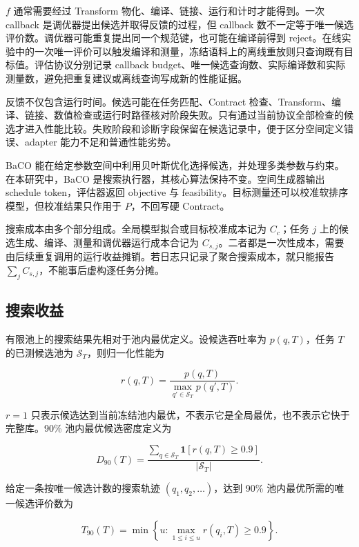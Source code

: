 $f$ 通常需要经过 Transform 物化、编译、链接、运行和计时才能得到。一次 callback 是调优器提出候选并取得反馈的过程，但 callback 数不一定等于唯一候选评价数。调优器可能重复提出同一个规范键，也可能在编译前得到 reject。在线实验中的一次唯一评价可以触发编译和测量，冻结语料上的离线重放则只查询既有目标值。评估协议分别记录 callback budget、唯一候选查询数、实际编译数和实际测量数，避免把重复建议或离线查询写成新的性能证据。

反馈不仅包含运行时间。候选可能在任务匹配、Contract 检查、Transform、编译、链接、数值检查或运行时路径核对阶段失败。只有通过当前协议全部检查的候选才进入性能比较。失败阶段和诊断字段保留在候选记录中，便于区分空间定义错误、adapter 能力不足和普通性能劣势。

BaCO 能在给定参数空间中利用贝叶斯优化选择候选，并处理多类参数与约束\cite{Hellsten2023BaCO}。在本研究中，BaCO 是搜索执行器，其核心算法保持不变。空间生成器输出 schedule token，评估器返回 objective 与 feasibility。目标测量还可以校准软排序模型，但校准结果只作用于 $P$，不回写硬 Contract。

搜索成本由多个部分组成。全局模型拟合或目标校准成本记为 $C_c$；任务 $j$ 上的候选生成、编译、测量和调优器运行成本合记为 $C_{s,j}$。二者都是一次性成本，需要由后续重复调用的运行收益摊销。若日志只记录了聚合搜索成本，就只能报告 $\sum_j C_{s,j}$，不能事后虚构逐任务分摊。

\subsection{搜索收益}

有限池上的搜索结果先相对于池内最优定义。设候选吞吐率为 $p(q,T)$，任务 $T$ 的已测候选池为 $\mathcal{S}_T$，则归一化性能为

\begin{equation}
r(q,T)
=
\frac{p(q,T)}
{\max_{q'\in\mathcal{S}_T}p(q',T)}.
\label{eq:chapter2-normalized-performance}
\end{equation}

$r=1$ 只表示候选达到当前冻结池内最优，不表示它是全局最优，也不表示它快于完整库。90\% 池内最优候选密度定义为

\begin{equation}
D_{90}(T)
=
\frac{
\sum_{q\in\mathcal{S}_T}
\mathbf{1}\!\left[r(q,T)\geq0.9\right]
}{
\left|\mathcal{S}_T\right|
}.
\label{eq:chapter2-d90}
\end{equation}

给定一条按唯一候选计数的搜索轨迹 $(q_1,q_2,\ldots)$，达到 90\% 池内最优所需的唯一候选评价数为

\begin{equation}
T_{90}(T)
=
\min\left\{
u:
\max_{1\leq i\leq u}r(q_i,T)\geq0.9
\right\}.
\label{eq:chapter2-t90}
\end{equation}

